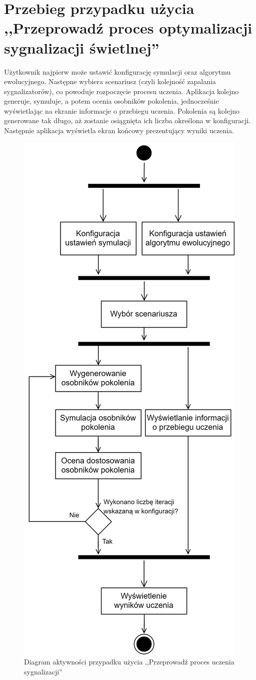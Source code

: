\section*{Przebieg przypadku użycia ,,Przeprowadź proces optymalizacji sygnalizacji świetlnej''}
Użytkownik najpierw może ustawić konfigurację symulacji oraz algorytmu ewolucyjnego. Następne wybiera scenariusz (czyli kolejność zapalania sygnalizatorów), co powoduje rozpoczęcie procesu uczenia. Aplikacja kolejno generuje, symuluje, a potem ocenia osobników pokolenia, jednocześnie wyświetlając na ekranie informacje o przebiegu uczenia. Pokolenia są kolejno generowane tak długo, aż zostanie osiągnięta ich liczba określona w konfiguracji. Następnie aplikacja wyświetla ekran końcowy prezentujący wyniki uczenia.
\begin{figure}[H]
	\centering
	\includegraphics[height=0.8\textheight]{diagram_aktywnosci}
	\caption[Diagram aktywności przypadku użycia ,,Przeprowadź proces uczenia sygnalizacji'']{Diagram aktywności przypadku użycia ,,Przeprowadź proces uczenia sygnalizacji''}
	\label{fig:diagramaktywnosci}
\end{figure}
